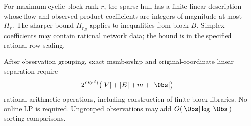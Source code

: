\begin{theorem}\label{thm:bounded-rank}
For maximum cyclic block rank $r$, the sparse hull has a finite linear
description whose flow and observed-product coefficients are integers
of magnitude at most $H_r$. The sharper bound $H_{r_B}$ applies to
inequalities from block $B$. Simplex coefficients may contain rational
network data; the bound is in the specified rational row scaling.

After observation grouping, exact membership and original-coordinate
linear separation require
\begin{equation}\label{eq:bounded-rank-complexity}
 2^{O(r^2)}\bigl(|V|+|E|+m+|\Obs|\bigr)
\end{equation}
rational arithmetic operations, including construction of finite
block libraries. No online LP is required. Ungrouped observations may
add $O(|\Obs|\log|\Obs|)$ sorting comparisons.
\end{theorem}
